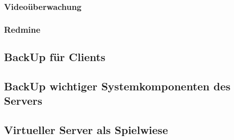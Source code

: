 \subsubsection{Videoüberwachung}

\subsubsection{Redmine}

\subsection{BackUp für Clients}

\subsection{BackUp wichtiger Systemkomponenten des Servers}

\subsection{Virtueller Server als Spielwiese}
